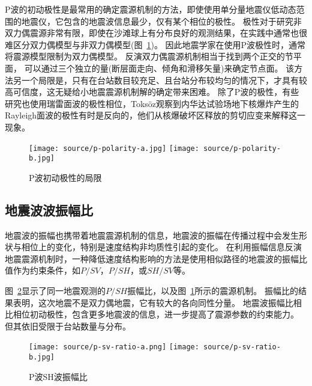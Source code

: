 P波的初动极性是最常用的确定震源机制的方法，即使使用单分量地震仪低动态范围的地震仪，它包含的地震波信息最少，仅有某个相位的极性。
极性对于研究非双力偶震源非常有限，即使在沙滩球上有分布良好的观测结果，在实践中通常也很难区分双力偶模型与非双力偶模型(图~\ref{fig:p-polarity})。
因此地震学家在使用P波极性时，通常将震源模型限制为双力偶模型。
反演双力偶震源机制相当于找到两个正交的节平面，
可以通过三个独立的量(断层面走向、倾角和滑移矢量)来确定节点面。
该方法另一个局限是，只有在台站数目较充足、且台站分布较均匀的情况下，才具有较高可信度，这无疑给小地震震源机制解的确定带来困难。
除了P波的极性，有些研究也使用瑞雷面波的极性相位，Toksöz观察到内华达试验场地下核爆炸产生的Rayleigh面波的极性有时是反向的，他们从核爆破坏区释放的剪切应变来解释这一现象\citep{toksoz1972tectonic}。
\begin{figure}[h]
    \centering
    \texttt{[image: source/p-polarity-a.jpg]}
    \texttt{[image: source/p-polarity-b.jpg]}
    \caption{P波初动极性的局限}
    \label{fig:p-polarity}
\end{figure}


\subsection{地震波波振幅比}
地震波的振幅也携带着地震震源机制的信息，地震波的振幅在传播过程中会发生形状与相位上的变化，特别是速度结构非均质性引起的变化。
在利用振幅信息反演地震震源机制时，一种降低速度结构影响的方法是使用相似路径的地震波的振幅比值作为约束条件，如$P/SV$，$P/SH$，或$SH/SV$等。

图~\ref{fig:p-sv-ratio}显示了同一地震观测的$P/SH$振幅比，以及图~\ref{fig:p-polarity}所示的震源机制。
振幅比的结果表明，这次地震不是双力偶地震，它有较大的各向同性分量。
地震波振幅比相比相位初动极性，包含更多地震波的信息，进一步提高了震源参数的约束能力。
但其依旧受限于台站数量与分布。

\begin{figure}[h]
    \centering
    \texttt{[image: source/p-sv-ratio-a.png]}
    \texttt{[image: source/p-sv-ratio-b.jpg]}
    \caption{P波SH波振幅比}
    \label{fig:p-sv-ratio}
\end{figure}



